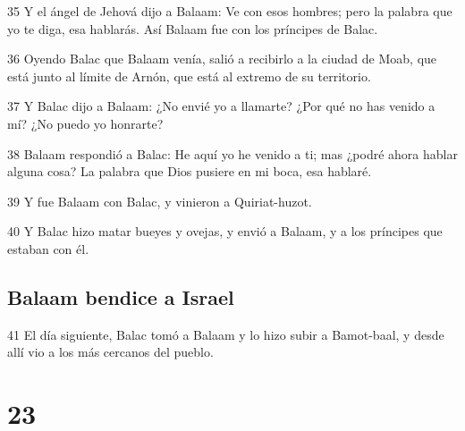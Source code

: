 \par 35 Y el ángel de Jehová dijo a Balaam: Ve con esos hombres; pero la palabra que yo te diga, esa hablarás. Así Balaam fue con los príncipes de Balac.
\par 36 Oyendo Balac que Balaam venía, salió a recibirlo a la ciudad de Moab, que está junto al límite de Arnón, que está al extremo de su territorio.
\par 37 Y Balac dijo a Balaam: ¿No envié yo a llamarte? ¿Por qué no has venido a mí? ¿No puedo yo honrarte?
\par 38 Balaam respondió a Balac: He aquí yo he venido a ti; mas ¿podré ahora hablar alguna cosa? La palabra que Dios pusiere en mi boca, esa hablaré.
\par 39 Y fue Balaam con Balac, y vinieron a Quiriat-huzot.
\par 40 Y Balac hizo matar bueyes y ovejas, y envió a Balaam, y a los príncipes que estaban con él.

\section*{Balaam bendice a Israel}

\par 41 El día siguiente, Balac tomó a Balaam y lo hizo subir a Bamot-baal, y desde allí vio a los más cercanos del pueblo.

\chapter{23}

